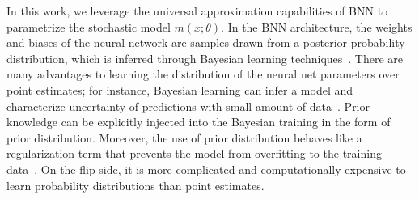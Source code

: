 In this work, we leverage the universal approximation capabilities of BNN to
parametrize the stochastic model $m(x;\theta)$.
%
In the BNN architecture, the weights and biases of the neural network are
samples drawn from a posterior probability distribution, which is inferred
through Bayesian learning techniques~\cite{jospin2020hands}. 
%
There are many advantages to learning the distribution of the neural net
parameters over point estimates; for instance, Bayesian learning can infer a
model and characterize uncertainty of predictions with small amount of
data~\cite{jospin2020hands}. 
%
Prior knowledge can be explicitly injected into the Bayesian training in the form of 
prior distribution.
%
Moreover, the use of prior distribution behaves like a regularization term
that prevents the model from overfitting to the training
data~\cite{bishop2006pattern}. 
%
On the flip side, it is more complicated and computationally expensive to learn
probability distributions than point estimates.

